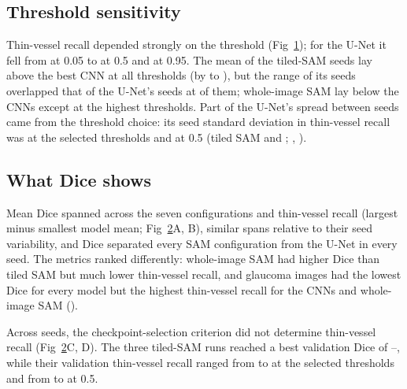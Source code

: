 \subsection*{Threshold sensitivity}
Thin-vessel recall depended strongly on the threshold (Fig~\ref{fig:threshold}); for the U-Net it fell from
\CurveUNetThinLow{} at 0.05 to \CurveUNetThinMid{} at 0.5 and \CurveUNetThinHigh{} at 0.95. The mean of the tiled-SAM seeds
lay above the best CNN at all \NThresholds{} thresholds (by \CurveSAMTiledGapBestMinTest{} to
\CurveSAMTiledGapBestMaxTest), but the range of its seeds overlapped that of the U-Net's seeds at
\CurveSAMTiledOverlapUNetTest{} of them; whole-image SAM lay below the CNNs except at the \CurveSAMWholeAboveBestTest{}
highest thresholds. Part of the U-Net's spread between seeds came from the threshold choice: its seed standard deviation
in thin-vessel recall was \UNetThinSdSeed{} at the selected thresholds and \UNetThinFixSdSeed{} at 0.5 (tiled SAM
\SAMTiledThinSdSeed{} and \SAMTiledThinFixSdSeed; , ).

\begin{figure}[!h]
\caption{\CapThreshold}
\label{fig:threshold}
\end{figure}

\subsection*{What Dice shows}
Mean Dice spanned \SpreadDice{} across the seven configurations and thin-vessel recall \SpreadThin{} (largest minus
smallest model mean; Fig~\ref{fig:tradeoff}A, B), similar spans relative to their seed variability, and Dice separated
every SAM configuration from the U-Net in every seed. The metrics ranked differently: whole-image SAM had higher Dice than
tiled SAM but much lower thin-vessel recall, and glaucoma images had the lowest Dice for every model but the highest
thin-vessel recall for the CNNs and whole-image SAM ().

Across seeds, the checkpoint-selection criterion did not determine thin-vessel recall (Fig~\ref{fig:tradeoff}C, D). The
three tiled-SAM runs reached a best validation Dice of \SAMTiledValBestDiceMin--\SAMTiledValBestDiceMax, while their
validation thin-vessel recall ranged from \SAMTiledValThinMin{} to \SAMTiledValThinMax{} at the selected thresholds and from
\SAMTiledValThinFixMin{} to \SAMTiledValThinFixMax{} at 0.5.

\begin{figure}[!h]
\caption{\CapTradeoff}
\label{fig:tradeoff}
\end{figure}

